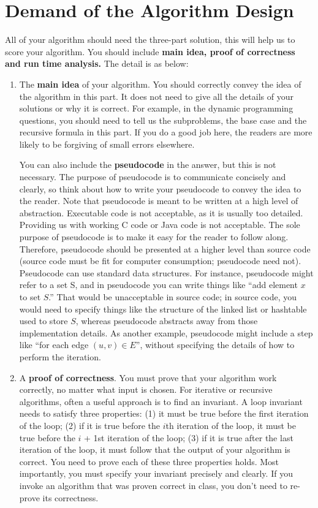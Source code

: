 \documentclass[10.5pt]{article}
\begin{document}
	\section*{Demand of the Algorithm Design}
All of your algorithm should need the three-part solution, this will help us to score your algorithm. You should include {\large\textbf{main idea,  proof of correctness and run time analysis.}} The detail is as below:
\begin{enumerate}

\item The {\textbf{main idea}} of your algorithm. You should correctly convey the idea of the algorithm in this part. It does not need to give all the details of your solutions or why it is correct. For example, in the dynamic programming questions, you should need to tell us the subproblems, the base case and the recursive formula in this part. If you do a good job here, the readers are more likely to be forgiving of small errors elsewhere. 

You can also include the {\textbf{pseudocode}} in the answer, but this is not necessary. The purpose of pseudocode is to communicate concisely and clearly, so think about how to write your pseudocode to convey the idea to the
reader.
Note that pseudocode is meant to be written at a high level of abstraction. Executable code is
not acceptable, as it is usually too detailed. Providing us with working C code or Java code
is not acceptable. The sole purpose of pseudocode is to make it easy for the reader to follow
along. Therefore, pseudocode should be presented at a higher level than source code (source
code must be fit for computer consumption; pseudocode need not). Pseudocode can use
standard data structures. For instance, pseudocode might refer to a set S, and in pseudocode
you can write things like “add element $x$ to set $S$.” That would be unacceptable in source
code; in source code, you would need to specify things like the structure of the linked list
or hashtable used to store $S$, whereas pseudocode abstracts away from those implementation
details. As another example, pseudocode might include a step like “for each edge $(u, v) \in E$”,
without specifying the details of how to perform the iteration. 

\item A {\textbf{proof of correctness}}.  You must prove that your algorithm work correctly, no matter
what input is chosen.
For iterative or recursive algorithms, often a useful approach is to find an invariant. A loop
invariant needs to satisfy three properties: (1) it must be true before the first iteration of the
loop; (2) if it is true before the $i$th iteration of the loop, it must be true before the $i$ + 1st
iteration of the loop; (3) if it is true after the last iteration of the loop, it must follow that the output of your algorithm is correct. You need to prove each of these three properties holds.
Most importantly, you must specify your invariant precisely and clearly.
If you invoke an algorithm that was proven correct in class, you don’t need to re-prove its correctness.


\end{enumerate}
\end{document}
